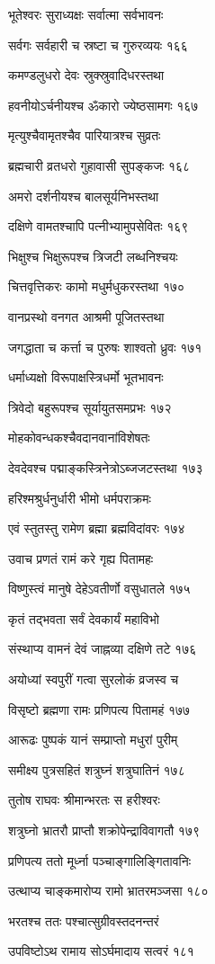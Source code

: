 भूतेश्वरः सुराध्यक्षः सर्वात्मा सर्वभावनः

सर्वगः सर्वहारी च स्रष्टा च गुरुरव्ययः १६६

कमण्डलुधरो देवः स्रुक्स्रुवादिधरस्तथा

हवनीयोऽर्चनीयश्च ॐकारो ज्येष्ठसामगः १६७

मृत्युश्चैवामृतश्चैव पारियात्रश्च सुव्रतः

ब्रह्मचारी व्रतधरो गुहावासी सुपङ्कजः १६८

अमरो दर्शनीयश्च बालसूर्यनिभस्तथा

दक्षिणे वामतश्चापि पत्नीभ्यामुपसेवितः १६९

भिक्षुश्च भिक्षुरूपश्च त्रिजटी लब्धनिश्चयः

चित्तवृत्तिकरः कामो मधुर्मधुकरस्तथा १७०

वानप्रस्थो वनगत आश्रमी पूजितस्तथा

जगद्धाता च कर्त्ता च पुरुषः शाश्वतो ध्रुवः १७१

धर्माध्यक्षो विरूपाक्षस्त्रिधर्मो भूतभावनः

त्रिवेदो बहुरूपश्च सूर्यायुतसमप्रभः १७२

मोहकोवन्धकश्चैवदानवानांविशेषतः

देवदेवश्च पद्माङ्कस्त्रिनेत्रोऽब्जजटस्तथा १७३

हरिश्मश्रुर्धनुर्धारी भीमो धर्मपराक्रमः

एवं स्तुतस्तु रामेण ब्रह्मा ब्रह्मविदांवरः १७४

उवाच प्रणतं रामं करे गृह्य पितामहः

विष्णुस्त्वं मानुषे देहेऽवतीर्णो वसुधातले १७५

कृतं तद्भवता सर्वं देवकार्यं महाविभो

संस्थाप्य वामनं देवं जाह्नव्या दक्षिणे तटे १७६

अयोध्यां स्वपुरीं गत्वा सुरलोकं व्रजस्व च

विसृष्टो ब्रह्मणा रामः प्रणिपत्य पितामहं १७७

आरूढः पुष्पकं यानं सम्प्राप्तो मधुरां पुरीम्

समीक्ष्य पुत्रसहितं शत्रुघ्नं शत्रुघातिनं १७८

तुतोष राघवः श्रीमान्भरतः स हरीश्वरः

शत्रुघ्नो भ्रातरौ प्राप्तौ शक्रोपेन्द्राविवागतौ १७९

प्रणिपत्य ततो मूर्ध्ना पञ्चाङ्गालिङ्गितावनिः

उत्थाप्य चाङ्कमारोप्य रामो भ्रातरमञ्जसा १८०

भरतश्च ततः पश्चात्सुग्रीवस्तदनन्तरं

उपविष्टोऽथ रामाय सोऽर्घमादाय सत्वरं १८१

